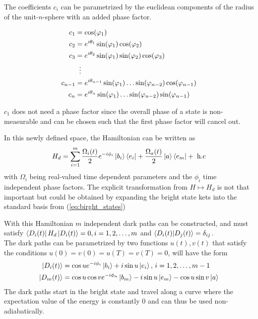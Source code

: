 The coefficients $c_i$ can be parametrized by the euclidean components of the radius of the unit-$n$-sphere with an added phase factor.

\begin{equation}
\begin{aligned}
c_1 &= \cos(\varphi_1)
\\ 
c_2 &= e^{i\theta_1}\sin(\varphi_1)\cos(\varphi_2)
\\ 
c_3 &= e^{i\theta_2}\sin(\varphi_1)\sin(\varphi_2)\cos(\varphi_3)
\\
&\hspace{2mm}\vdots
\\
c_{n-1} &= e^{i\theta_{n-1}}\sin(\varphi_1)\dots\sin(\varphi_{n-2})\cos(\varphi_{n-1})
\\
c_{n} &= e^{i\theta_{n}}\sin(\varphi_1)\dots\sin(\varphi_{n-2})\sin(\varphi_{n-1})
\end{aligned}
\end{equation}

$c_1$ does not need a phase factor since the overall phase of a state is non-measurable and can be chosen such that the first phase factor will cancel out. 

In this newly defined space, the Hamiltonian can be written as
\begin{equation}
H_d = \sum_{i = 1}^m \frac{\Omega_i(t)}{2}e^{-i\phi_i}\ket{b_i}\bra{e_i} + \frac{\Omega_a(t)}{2}\ket{a}\bra{e_m} +\;\text{h.c}
\label{eq:HamdN}
\end{equation}
with $\Omega_i$ being real-valued time dependent parameters and the $\phi_i$ time independent phase factors. The explicit transformation from $H \mapsto H_d$ is not that important but could be obtained by expanding the bright state kets into the standard basis from (\ref{eq:birght_states})

With this Hamiltonian $m$ independent dark paths can be constructed, and must satisfy $\bra{D_i(t)}H_d\ket{D_i(t)} = 0, i = 1,2,\dots,m$ and $\bra{D_i(t)}\ket{D_j(t)} = \delta_{ij}$.\\
The dark paths can be parametrized by two functions $u(t),v(t)$ that satisfy the conditions $u(0) = v(0) = u(T) = v(T) = 0$,  will have the form
\begin{equation}
\begin{aligned}
\ket{D_i(t)} &= \cos u e^{-i\phi_i}\ket{b_i} + i\sin u \ket{e_i},\, i = 1,2,\dots,m-1
\\
\ket{D_m(t)} &= \cos u \cos v e^{-i\phi_n}\ket{b_m} - i\sin u \ket{e_m} - \cos u \sin v \ket{a}
\end{aligned}
\end{equation}
The dark paths start in the bright state and travel along a curve where the expectation value of the energy is constantly $0$ and can thus be used non-adiabatically.


